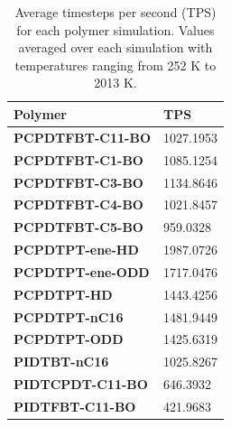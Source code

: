 \begin{table}[ht]
    \centering
    \begin{tabular}{l|l}
        \textbf{Polymer} & \textbf{TPS} \\
        \hline
        \textbf{PCPDTFBT-C11-BO  }   &       1027.1953   \\
        \textbf{PCPDTFBT-C1-BO   }    &       1085.1254   \\
        \textbf{PCPDTFBT-C3-BO   }   &       1134.8646   \\
        \textbf{PCPDTFBT-C4-BO   }   &       1021.8457   \\
        \textbf{PCPDTFBT-C5-BO   }   &       959.0328    \\
        \textbf{PCPDTPT-ene-HD   }    &       1987.0726   \\
        \textbf{PCPDTPT-ene-ODD  }    &       1717.0476   \\
        \textbf{PCPDTPT-HD       }   &       1443.4256   \\
        \textbf{PCPDTPT-nC16     }   &       1481.9449   \\
        \textbf{PCPDTPT-ODD      }   &       1425.6319   \\
        \textbf{PIDTBT-nC16      }   &       1025.8267   \\
        \textbf{PIDTCPDT-C11-BO  }   &       646.3932    \\
        \textbf{PIDTFBT-C11-BO   }   &       421.9683    \\
    \end{tabular}
    \caption{Average timesteps per second (TPS) for each polymer simulation. Values averaged over each simulation with temperatures ranging from 252 K to 2013 K.}
    \label{tab:pl_tps}
\end{table}

